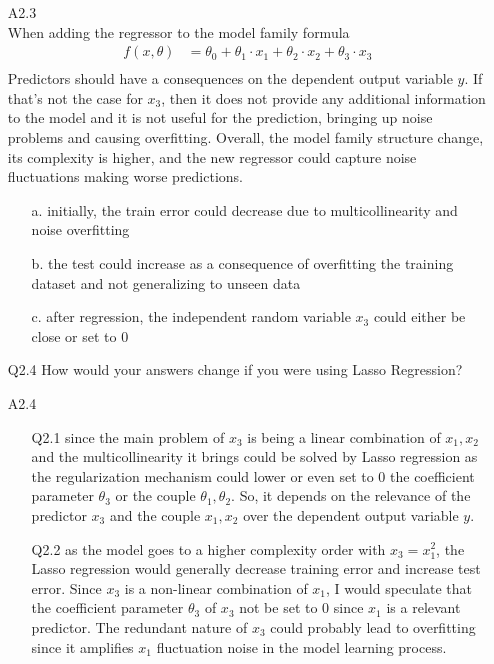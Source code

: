 \documentclass[unicode, 11pt, a4paper]{scrartcl}
\newcommand{\myex}[1]{\begin{equation*}\begin{aligned} #1 \end{aligned}\end{equation*}}
\begin{document}
\begin{itemize}
	\item[A2.3] ~\\
	      When adding the regressor to the model family formula
	      \myex{
		      f(x, \theta) &= \theta_0 + \theta_1 \cdot x_1 + \theta_2 \cdot x_2 + \theta_3 \cdot x_3\\
	      }
	      Predictors should have a consequences on the dependent output variable $y$.
	      If that's not the case for $x_3$,
	      then it does not provide any additional information to the model
	      and it is not useful for the prediction,
	      bringing up noise problems and causing overfitting.
	      Overall, the model family structure change,
	      its complexity is higher,
	      and the new regressor could capture noise fluctuations making worse predictions.
	      \begin{itemize}
		      \item[a.] initially, the train error could decrease
		            due to multicollinearity and noise overfitting
		      \item[b.] the test could increase as a consequence
		            of overfitting  the training dataset and not generalizing to unseen data
		      \item[c.] after regression, the independent random variable $x_3$
		            could either be close or set to 0
	      \end{itemize}

	\item[Q2.4] How would your answers change if you were using Lasso Regression?
	\item[A2.4] ~\\
	      \begin{itemize}
		      \item[Q2.1] since the main problem of $x_3$ is being a linear combination of
		            $x_1, x_2$ and the multicollinearity it brings
		            could be solved by Lasso regression
		            as the regularization mechanism could lower
		            or even set to 0 the coefficient parameter $\theta_3$
		            or the couple $\theta_1, \theta_2$.
		            So, it depends on the relevance of the predictor $x_3$ and the couple
		            $x_1, x_2$ over the dependent output variable $y$.

		      \item[Q2.2] as the model goes to a higher complexity order with $x_3 = x_1^2$,
		            the Lasso regression would generally decrease training error
		            and increase test error.
		            Since $x_3$ is a non-linear combination of $x_1$,
		            I would speculate that the coefficient parameter $\theta_3$
		            of $x_3$ not be set to 0 since $x_1$ is a relevant predictor.
		            The redundant nature of $x_3$ could probably lead to overfitting since it
		            amplifies $x_1$ fluctuation noise in the model learning process.


\end{itemize}
\end{itemize}
\end{document}
